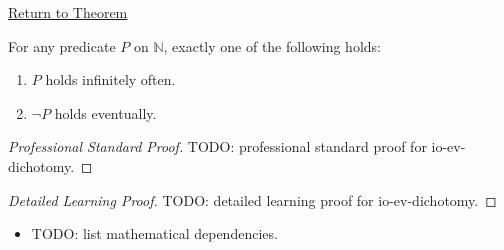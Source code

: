 \newpage
{}
\label{prf:io-ev-dichotomy}

\begin{remark*}[Return]
\hyperref[prop:io-ev-dichotomy]{Return to Theorem}
\end{remark*}

\begin{theorem*}
For any predicate $P$ on $\mathbb{N}$, exactly one of the following holds:
\begin{enumerate}[label=(\roman*)]
  \item $P$ holds infinitely often.
  \item $\neg P$ holds eventually.
\end{enumerate}
\end{theorem*}

\begin{proof}[Professional Standard Proof]
\LRAProofBodyStart
TODO: professional standard proof for io-ev-dichotomy.
\end{proof}

\begin{proof}[Detailed Learning Proof]
\LRAProofBodyStart
TODO: detailed learning proof for io-ev-dichotomy.
\end{proof}

\begin{remark*}
\end{remark*}

\begin{dependencies}
\begin{itemize}
  \item TODO: list mathematical dependencies.
\end{itemize}
\end{dependencies}

\clearpage
